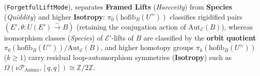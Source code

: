 \begin{proposition}
\begin{enumerate}
\[  \]
  (\texttt{ForgetfulLiftMode}), separates \textbf{Framed Lifts} (\emph{Haecceity}) from \textbf{Species} (\emph{Quiddity}) and higher \textbf{Isotropy}: $\pi_0(\mathrm{hofib}_B(U^{\simeq}))$ classifies rigidified pairs $(E', \theta : U(E') \xrightarrow{\sim} B)$ (retaining the conjugation action of $\mathrm{Aut}_{\mathcal{E}}(B)$), whereas isomorphism classes (\emph{Species}) of $\mathcal{E}'$-lifts of $B$ are classified by the \textbf{orbit quotient} $\pi_0(\mathrm{hofib}_B(U^{\simeq})) / \mathrm{Aut}_{\mathcal{E}}(B)$, and higher homotopy groups $\pi_k(\mathrm{hofib}_B(U^{\simeq}))$ ($k \ge 1$) carry residual loop-automorphism symmetries (\textbf{Isotropy}) such as $\Omega(\nu\mathcal{P}_{\mathrm{Anima}}, [q,q]) \cong \mathbb{Z}/2\mathbb{Z}$.
\end{enumerate}
\end{proposition}

